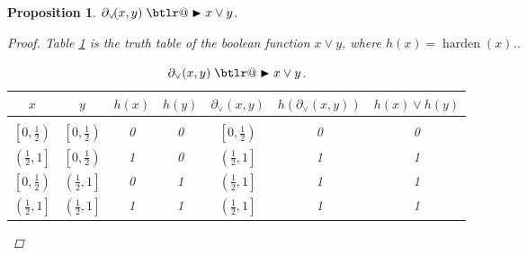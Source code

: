 \documentclass{article} %
\makeatletter
\newtheorem{prop}{Proposition}
\DeclareRobustCommand{\btright}{\mathrel{\mathpalette\btlr@\blacktriangleright}}
\newcommand{\btlr@}[2]{%
	\begingroup
	\sbox\z@{$\m@th#1\triangleright$}%
	\sbox\tw@{\resizebox{1.1\wd\z@}{1.1\ht\z@}{\raisebox{\depth}{$\m@th#1\mkern-1mu#2$}}}%
	\ht\tw@=\ht\z@ \dp\tw@=\dp\z@ \wd\tw@=\wd\z@
	\copy\tw@
	\endgroup
}
\makeatother
\begin{document}
\begin{prop}\label{prop:or}
	$\partial_{\vee}\!(x,y) \btright x \vee y$.
\begin{proof}
	Table \ref{or-table} is the truth table of the boolean function $x \vee y$, where $h(x) = \operatorname{harden}(x)$..
	\begin{table}[h!]
	\begin{center}
		\begin{tabular}{ccccccc}
			\multicolumn{1}{c}{$x$}  &\multicolumn{1}{c}{$y$}  &\multicolumn{1}{c}{$h(x)$}  &\multicolumn{1}{c}{$h(y)$} &\multicolumn{1}{c}{$\partial_{\vee}(x, y)$} &\multicolumn{1}{c}{$h(\partial_{\vee}(x, y))$}
			&\multicolumn{1}{c}{$h(x) \vee h(y)$}
			\\ \hline \\
			$\left[0, \frac{1}{2}\right)$ & $\left[0, \frac{1}{2}\right)$ & 0 & 0 & $\left[0,\frac{1}{2}\right)$ & 0 & 0\\[0.1cm]
			$\left(\frac{1}{2}, 1\right]$ & $\left[0, \frac{1}{2}\right)$ &1 & 0 & $\left(\frac{1}{2},1\right]$ & 1 & 1\\[0.1cm]
			$\left[0, \frac{1}{2}\right)$ & $\left(\frac{1}{2}, 1\right]$ &0 & 1 & $\left(\frac{1}{2},1\right]$ & 1 & 1\\[0.1cm]
			$\left(\frac{1}{2}, 1\right]$ & $\left(\frac{1}{2}, 1\right]$ &1 & 1 & $\left(\frac{1}{2},1\right]$ & 1 & 1\\[0.1cm]
		\end{tabular}
	\end{center}
	\caption{$\partial_{\vee}(x,y) \btright x \vee y$.}\label{or-table}
	\end{table}			
\end{proof}
\end{prop}
\end{document}
